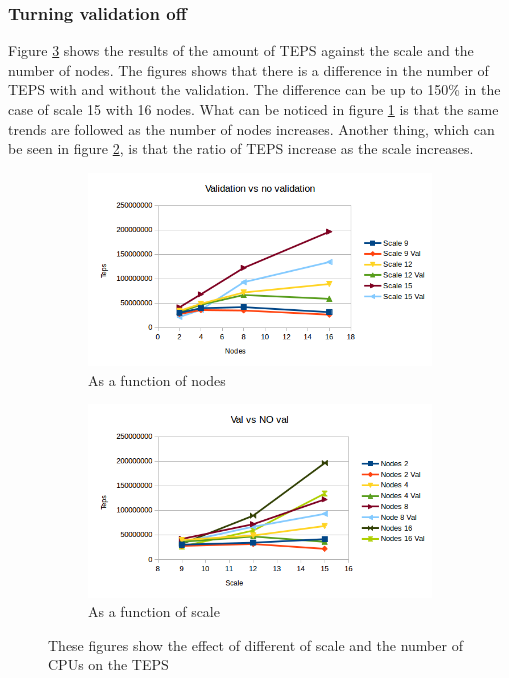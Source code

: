 \subsubsection{Turning validation off}
\label{sec:noval}
 Figure \ref{fig:val_vs_noval} shows the results of the amount of TEPS against the scale and the number of nodes. The figures shows that there is a difference in the number of TEPS with and without the validation. The difference can be up to 150\% in the case of scale 15 with 16 nodes. What can be noticed in figure \ref{fig:nodes_val_noval} is that the same trends are followed as the number of nodes increases. Another thing, which can be seen in figure \ref{fig:scale_val_noval}, is that the ratio of TEPS increase as the scale increases.
\begin{figure}[!h]
\centering
\begin{subfigure}{.5\textwidth}
  \centering
  \includegraphics[width=\linewidth]{images/nodes_scale_vs_noscale.png}
  \caption{As a function of nodes}
  \label{fig:nodes_val_noval}
\end{subfigure}%
\begin{subfigure}{.5\textwidth}
  \centering
  \includegraphics[width=\linewidth]{images/scale_val_vs_noval.png}
  \caption{As a function of scale}
  \label{fig:scale_val_noval}
\end{subfigure}
\caption{These figures show the effect of different of scale and the number of CPUs on the TEPS}
\label{fig:val_vs_noval}
\end{figure}



